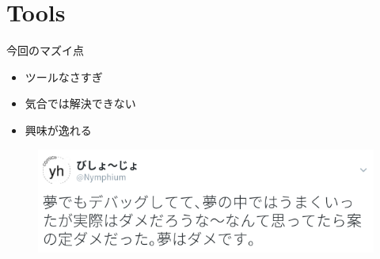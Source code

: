 \section{Tools}
\begin{frame}
	\frametitlesec

	\begin{minipage}[t]{.39\textwidth}
		今回のマズイ点
		\begin{itemize}
			\item ツールなさすぎ
			\item 気合では解決できない
			\item 興味が逸れる
		\end{itemize}
	\end{minipage}
	\begin{minipage}[t]{.51\textwidth}
		\begin{figure}[h]
			\centering
			\includegraphics[width=\textwidth]{img/dametwit.png}
		\end{figure}
	\end{minipage}

	\vspace{2\zw}

\end{frame}




